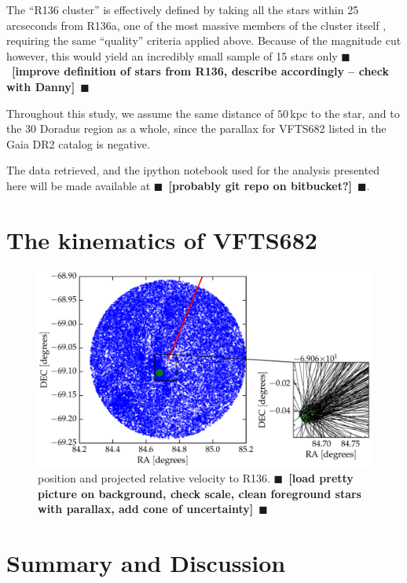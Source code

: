 \documentclass{aa}
\newcommand{\todo}[1]{{\large $\blacksquare$~\textbf{\color{red}[#1]}}~$\blacksquare$}
\begin{document}
The ``R136 cluster'' is effectively defined by taking all the stars
within 25 arcseconds from R136a, one of the most massive members of
the cluster itself \citep[][]{crowther:10}, requiring the same
``quality'' criteria applied above. Because of the magnitude cut
however, this would yield an incredibly small sample of 15 stars only
\todo{improve definition
  of stars from R136, describe accordingly -- check with Danny}

Throughout this study, we assume the same distance of $50$\,kpc to the star, and to
the 30 Doradus region as a whole, since the parallax for VFTS682
listed in the Gaia DR2 catalog is negative.

The data retrieved, and the ipython notebook used for the analysis
presented here will be made available at \todo{probably git repo on bitbucket?}. 

\section{The kinematics of VFTS682}
\label{sec:results}

\begin{figure}[htbp]
  \centering
  \includegraphics[width=\textwidth]{./figures/main_plot}  
  \caption{position and projected relative velocity to
    R136. \todo{load pretty picture on background, check scale, clean
      foreground stars with parallax, add cone of uncertainty}}
  \label{fig:main}
\end{figure}



\section{Summary and Discussion}
\label{sec:discussion}
\end{document}
